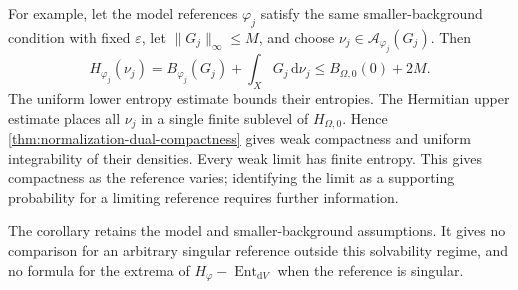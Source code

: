 For example, let the model references $\varphi_j$ satisfy the same smaller-background condition with fixed $\varepsilon$, let $\|G_j\|_\infty\leq M$, and choose $\nu_j\in\mathcal A_{\varphi_j}(G_j)$. Then
\[
 H_{\varphi_j}(\nu_j)
 =B_{\varphi_j}(G_j)+\int_XG_j\,\mathrm{d}\nu_j
 \leq B_{\Omega,0}(0)+2M.
\]
The uniform lower entropy estimate bounds their entropies. The Hermitian upper estimate places all $\nu_j$ in a single finite sublevel of $H_{\Omega,0}$. Hence \cref{thm:normalization-dual-compactness} gives weak compactness and uniform integrability of their densities. Every weak limit has finite entropy. This gives compactness as the reference varies; identifying the limit as a supporting probability for a limiting reference requires further information.

The corollary retains the model and smaller-background assumptions. It gives no comparison for an arbitrary singular reference outside this solvability regime, and no formula for the extrema of $H_\varphi-\operatorname{Ent}_{\mathrm{d}V}$ when the reference is singular.
